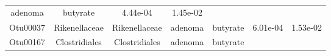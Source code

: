 \documentclass[11pt,]{article}
\begin{document}
\begin{longtable}[]{@{}ccccccc@{}}
\begin{minipage}[t]{0.09\columnwidth}
adenoma\strut
\end{minipage} & \begin{minipage}[t]{0.11\columnwidth}\centering\strut
butyrate\strut
\end{minipage} & \begin{minipage}[t]{0.09\columnwidth}\centering\strut
4.44e-04\strut
\end{minipage} & \begin{minipage}[t]{0.09\columnwidth}\centering\strut
1.45e-02\strut
\end{minipage}\tabularnewline
\begin{minipage}[t]{0.09\columnwidth}\centering\strut
Otu00037\strut
\end{minipage} & \begin{minipage}[t]{0.17\columnwidth}\centering\strut
Rikenellaceae\strut
\end{minipage} & \begin{minipage}[t]{0.17\columnwidth}\centering\strut
Rikenellaceae\strut
\end{minipage} & \begin{minipage}[t]{0.09\columnwidth}\centering\strut
adenoma\strut
\end{minipage} & \begin{minipage}[t]{0.11\columnwidth}\centering\strut
butyrate\strut
\end{minipage} & \begin{minipage}[t]{0.09\columnwidth}\centering\strut
6.01e-04\strut
\end{minipage} & \begin{minipage}[t]{0.09\columnwidth}\centering\strut
1.53e-02\strut
\end{minipage}\tabularnewline
\begin{minipage}[t]{0.09\columnwidth}\centering\strut
Otu00167\strut
\end{minipage} & \begin{minipage}[t]{0.17\columnwidth}\centering\strut
Clostridiales\strut
\end{minipage} & \begin{minipage}[t]{0.17\columnwidth}\centering\strut
Clostridiales\strut
\end{minipage} & \begin{minipage}[t]{0.09\columnwidth}\centering\strut
adenoma\strut
\end{minipage} & \begin{minipage}[t]{0.11\columnwidth}\centering\strut
butyrate\strut
\end{minipage} & \begin{minipage}[t]{0.09\columnwidth}\centering\strut

\end{minipage}
\end{longtable}
\end{document}
